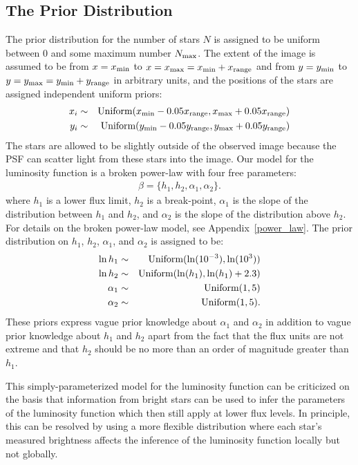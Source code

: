 \documentclass[12pt, preprint]{aastex}
\begin{document}
\subsection{The Prior Distribution}
The prior distribution for the number of stars $N$ is assigned to be uniform
between 0 and some maximum number $N_{\rm max}$. The extent of the image is
assumed to be from $x=x_{\rm min}$ to $x=x_{\rm max}=x_{\rm min} + x_{\rm range}$ and from
$y=y_{\rm min}$ to $y=y_{\rm max}=y_{\rm min} + y_{\rm range}$ in arbitrary units, and the
positions of the stars are assigned independent uniform priors:
\begin{eqnarray}
x_i &\sim& \textnormal{Uniform}(x_{\rm min} - 0.05x_{\rm range}, x_{\rm max} + 0.05x_{\rm range}) \\
y_i &\sim& \textnormal{Uniform}(y_{\rm min} - 0.05y_{\rm range}, y_{\rm max} + 0.05y_{\rm range})
\end{eqnarray}
The stars are allowed to be slightly outside of the observed image because the
PSF can scatter light from these stars into the image. Our model for the
luminosity function is a broken power-law with four
free parameters:
\begin{eqnarray}
\beta = \{h_1, h_2, \alpha_1, \alpha_2\}.
\end{eqnarray}
where $h_1$ is a lower flux limit, $h_2$ is a break-point, $\alpha_1$ is
the slope of the distribution between $h_1$ and $h_2$, and $\alpha_2$ is the
slope of the distribution above $h_2$. For details on the broken power-law
model, see Appendix~\ref{power_law}. The prior distribution on $h_1$, $h_2$,
$\alpha_1$, and $\alpha_2$ is assigned to be:
\begin{eqnarray}
\ln h_1 &\sim& \textnormal{Uniform}(\ln(10^{-3}), \ln(10^3)) \\
\ln h_2 &\sim& \textnormal{Uniform}(\ln(h_1), \ln(h_1) + 2.3) \\
\alpha_1 &\sim& \textnormal{Uniform}(1, 5) \\
\alpha_2 &\sim& \textnormal{Uniform}(1, 5).
\end{eqnarray}
These priors express vague prior knowledge about $\alpha_1$ and $\alpha_2$ in
addition to vague prior knowledge about $h_1$ and $h_2$ apart from the fact
that the flux units are not extreme and that $h_2$ should be no more than an
order of magnitude greater than $h_1$.

This simply-parameterized model for the luminosity function can be criticized
on the basis that information from bright stars can be used to infer the
parameters of the luminosity function which then still apply at lower flux
levels. In principle, this can be resolved by using a more flexible distribution
\citep[e.g.][]{2008ApJ...682..874K} where each star's measured brightness
affects the inference of the luminosity function locally but not globally.
\end{document}
